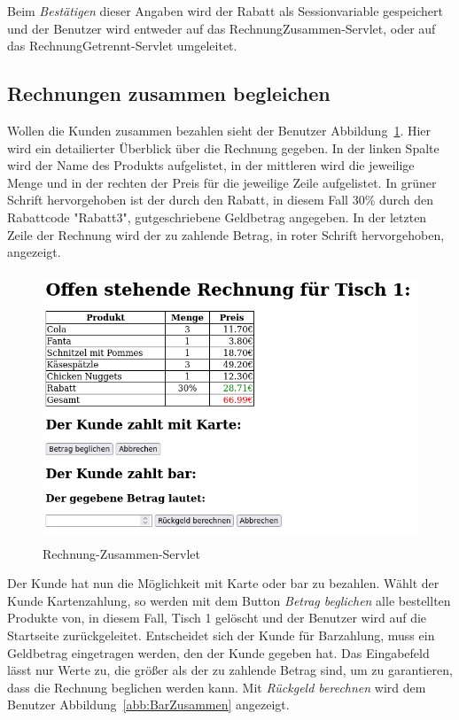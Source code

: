 Beim \textit{Bestätigen} dieser Angaben wird der Rabatt als Sessionvariable gespeichert und der Benutzer wird entweder auf das RechnungZusammen-Servlet, oder auf das RechnungGetrennt-Servlet umgeleitet.


\subsection{Rechnungen zusammen begleichen} %
\label{sub:Rechnungen zusammen begleichen}

Wollen die Kunden zusammen bezahlen sieht der Benutzer Abbildung~\ref{abb:RechnungZusammen}.
Hier wird ein detailierter Überblick über die Rechnung gegeben.
In der linken Spalte wird der Name des Produkts aufgelistet, in der mittleren wird die jeweilige Menge und in der rechten der Preis für die jeweilige Zeile aufgelistet.
In grüner Schrift hervorgehoben ist der durch den Rabatt, in diesem Fall 30\% durch den Rabattcode "Rabatt3", gutgeschriebene Geldbetrag angegeben.
In der letzten Zeile der Rechnung wird der zu zahlende Betrag, in roter Schrift hervorgehoben, angezeigt.

\begin{figure}[htb]
  \centering
  \includegraphics[height=8cm]{images/RechnungZusammenServlet.png}
  \caption[Rechnung-Zusammen-Servlet]{Rechnung-Zusammen-Servlet}
  \label{abb:RechnungZusammen}
\end{figure}

Der Kunde hat nun die Möglichkeit mit Karte oder bar zu bezahlen.
Wählt der Kunde Kartenzahlung, so werden mit dem Button \textit{Betrag beglichen} alle bestellten Produkte von, in diesem Fall, Tisch 1 gelöscht und der Benutzer wird auf die Startseite zurückgeleitet.
Entscheidet sich der Kunde für Barzahlung, muss ein Geldbetrag eingetragen werden, den der Kunde gegeben hat.
Das Eingabefeld lässt nur Werte zu, die größer als der zu zahlende Betrag sind, um zu garantieren, dass die Rechnung beglichen werden kann.
Mit \textit{Rückgeld berechnen} wird dem Benutzer Abbildung~\ref{abb:BarZusammen} angezeigt.

